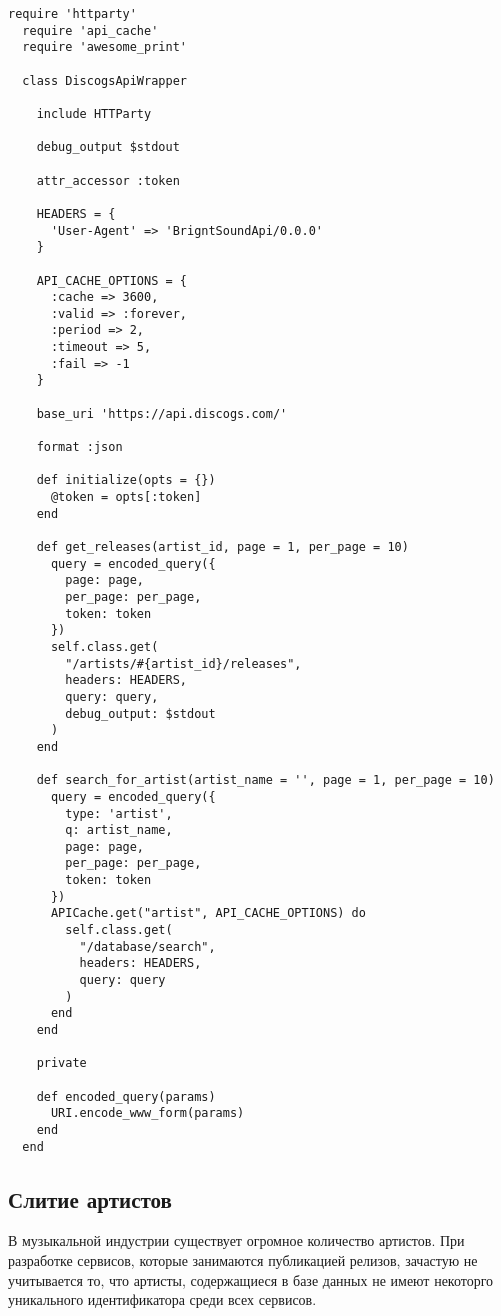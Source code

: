 \begin{lstlisting}[style=fsharpstyle,caption={Пример получения артистов по определенным параметрам}, label=lst:arch_and_mod:mvc:controller:discogs_wrapper_example]
  require 'httparty'
  require 'api_cache'
  require 'awesome_print'

  class DiscogsApiWrapper

    include HTTParty

    debug_output $stdout

    attr_accessor :token

    HEADERS = {
      'User-Agent' => 'BrigntSoundApi/0.0.0'
    }

    API_CACHE_OPTIONS = {
      :cache => 3600,
      :valid => :forever,
      :period => 2,
      :timeout => 5,
      :fail => -1
    }

    base_uri 'https://api.discogs.com/'

    format :json

    def initialize(opts = {})
      @token = opts[:token]
    end

    def get_releases(artist_id, page = 1, per_page = 10)
      query = encoded_query({
        page: page,
        per_page: per_page,
        token: token
      })
      self.class.get(
        "/artists/#{artist_id}/releases",
        headers: HEADERS,
        query: query,
        debug_output: $stdout
      )
    end

    def search_for_artist(artist_name = '', page = 1, per_page = 10)
      query = encoded_query({
        type: 'artist',
        q: artist_name,
        page: page,
        per_page: per_page,
        token: token
      })
      APICache.get("artist", API_CACHE_OPTIONS) do
        self.class.get(
          "/database/search",
          headers: HEADERS,
          query: query
        )
      end
    end

    private

    def encoded_query(params)
      URI.encode_www_form(params)
    end
  end

\end{lstlisting}

\subsection{Слитие артистов}

В музыкальной индустрии существует огромное количество артистов. При разработке сервисов, которые занимаются публикацией релизов, зачастую не учитывается то, что артисты, содержащиеся в базе данных не имеют некоторго уникального идентификатора среди всех сервисов.

